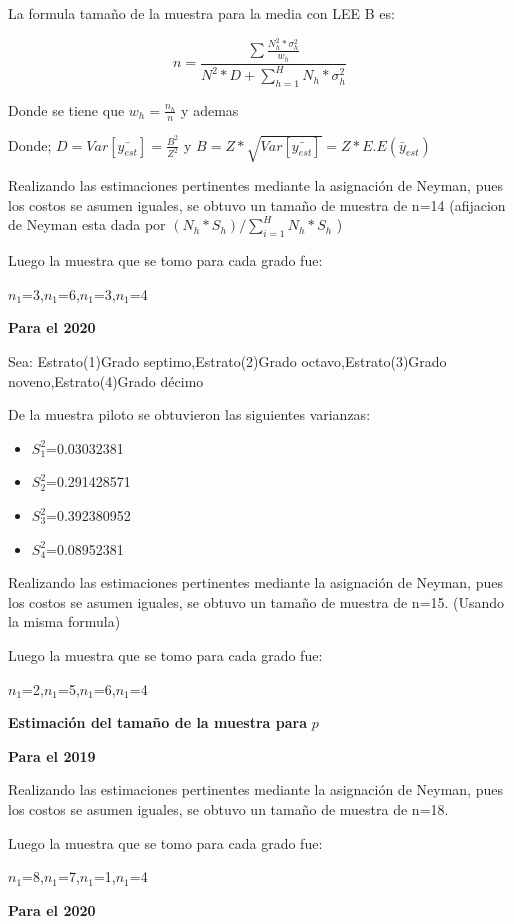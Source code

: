 \documentclass[
]{article}
\begin{document}
La formula tamaño de la muestra para la media con LEE B es:

\[n=\frac{\sum \frac{N_h^2*\sigma_h^2}{w_h}}{N^2*D+\sum^H_{h=1} N_h*\sigma_h^2}\]

Donde se tiene que \(w_h=\frac{n_h}{n}\) y ademas

Donde; \(D=Var[\bar{y_{est}}]=\frac{B^2}{Z^2}\) y
\(B=Z*\sqrt{Var[\bar{y_{est}}]}=Z*E.E(\bar{y}_{est})\)

Realizando las estimaciones pertinentes mediante la asignación de
Neyman, pues los costos se asumen iguales, se obtuvo un tamaño de
muestra de n=14 (afijacion de Neyman esta dada por
\((N_h*S_h)/\sum_{i=1}^H N_h*S_h\) )

Luego la muestra que se tomo para cada grado fue:

\(n_1\)=3,\(n_1\)=6,\(n_1\)=3,\(n_1\)=4

\newpage

\textbf{Para el 2020}

Sea: Estrato(1)Grado septimo,Estrato(2)Grado octavo,Estrato(3)Grado
noveno,Estrato(4)Grado décimo

De la muestra piloto se obtuvieron las siguientes varianzas:

\begin{itemize}
\item
  \(S^2_1\)=0.03032381
\item
  \(S^2_2\)=0.291428571
\item
  \(S^2_3\)=0.392380952
\item
  \(S^2_4\)=0.08952381
\end{itemize}

Realizando las estimaciones pertinentes mediante la asignación de
Neyman, pues los costos se asumen iguales, se obtuvo un tamaño de
muestra de n=15. (Usando la misma formula)

Luego la muestra que se tomo para cada grado fue:

\(n_1\)=2,\(n_1\)=5,\(n_1\)=6,\(n_1\)=4

\textbf{Estimación del tamaño de la muestra para} \(p\)

\textbf{Para el 2019}

Realizando las estimaciones pertinentes mediante la asignación de
Neyman, pues los costos se asumen iguales, se obtuvo un tamaño de
muestra de n=18.

Luego la muestra que se tomo para cada grado fue:

\(n_1\)=8,\(n_1\)=7,\(n_1\)=1,\(n_1\)=4

\textbf{Para el 2020}
\end{document}
